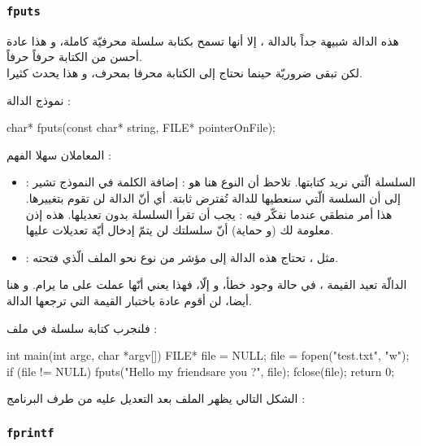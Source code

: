 \subsubsection{\texttt{fputs}}

هذه الدالة شبيهة جداً بالدالة
،
إلا أنها تسمح بكتابة سلسلة محرفيّة كاملة، و هذا عادة أحسن من الكتابة حرفاً حرفاً.\\
لكن
تبقى ضروريّة حينما نحتاج إلى الكتابة محرفا بمحرف، و هذا يحدث كثيرا.

نموذج الدالة :

\begin{Csource}
char* fputs(const char* string, FILE* pointerOnFile);
\end{Csource}

المعاملان سهلا الفهم :
\begin{itemize}
  \item {} :
السلسلة الّتي نريد كتابتها. تلاحظ أن النوع هنا هو
 :
إضافة الكلمة
في النموذج تشير إلى أن السلسة الّتي سنعطيها للدالة تُفترض ثابتة. أي أنّ الدالة لن تقوم بتغييرها. هذا أمر منطقي عندما نفكّر فيه :
يجب أن تقرأ السلسلة بدون تعديلها. هذه إذن معلومة لك (و حماية) أنّ سلسلتك لن يتمّ إدخال أيّة تعديلات عليها.
  \item {} :
 مثل
،
 تحتاج هذه الدالة إلى مؤشر من نوع
نحو الملف الّذي فتحته.
\end{itemize}

الدالّة تعيد القيمة
،
في حالة وجود خطأ، و إلّا، فهذا يعني أنّها عملت على ما يرام. و هنا أيضا، لن أقوم عادة باختبار القيمة التي ترجعها الدالة.

فلنجرب كتابة سلسلة في ملف :

\begin{Csource}
int main(int argc, char *argv[])
{
	FILE* file = NULL;
	file = fopen("test.txt", "w");
	if (file != NULL)
	{
    	 	fputs("Hello my friends\nHow are you ?", file);
    	 	fclose(file);
	}
	return 0;
}
\end{Csource}

الشكل التالي يظهر الملف بعد التعديل عليه من طرف البرنامج :


\subsubsection{\texttt{fprintf}}

